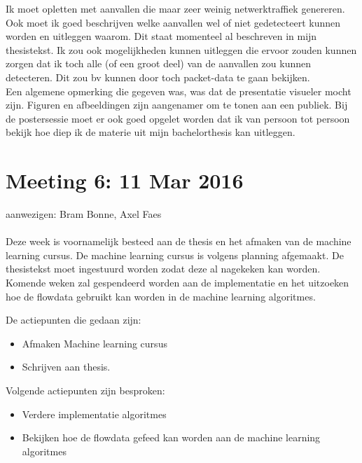 \noindent Ik moet opletten met aanvallen die maar zeer weinig netwerktraffiek genereren. Ook moet ik goed beschrijven welke aanvallen wel of niet gedetecteert kunnen worden en uitleggen waarom. Dit staat momenteel al beschreven in mijn thesistekst. Ik zou ook mogelijkheden kunnen uitleggen die ervoor zouden kunnen zorgen dat ik toch alle (of een groot deel) van de aanvallen zou kunnen detecteren. Dit zou bv kunnen door toch packet-data te gaan bekijken.\\

\noindent Een algemene opmerking die gegeven was, was dat de presentatie visueler mocht zijn. Figuren en afbeeldingen zijn aangenamer om te tonen aan een publiek. Bij de postersessie moet er ook goed opgelet worden dat ik van persoon tot persoon bekijk hoe diep ik de materie uit mijn bachelorthesis kan uitleggen. 

\section{Meeting 6: 11 Mar 2016}
aanwezigen: Bram Bonne, Axel Faes\\\\
\noindent Deze week is voornamelijk besteed aan de thesis en het afmaken van de machine learning cursus. De machine learning cursus is volgens planning afgemaakt. De thesistekst moet ingestuurd worden zodat deze al nagekeken kan worden. Komende weken zal gespendeerd worden aan de implementatie en het uitzoeken hoe de flowdata gebruikt kan worden in de machine learning algoritmes.

\noindent De actiepunten die gedaan zijn:
\begin{itemize}  
		\item Afmaken Machine learning cursus
        \item Schrijven aan thesis.
\end{itemize}

\noindent Volgende actiepunten zijn besproken:
\begin{itemize}  		
		\item Verdere implementatie algoritmes
        \item Bekijken hoe de flowdata gefeed kan worden aan de machine learning algoritmes
\end{itemize}

